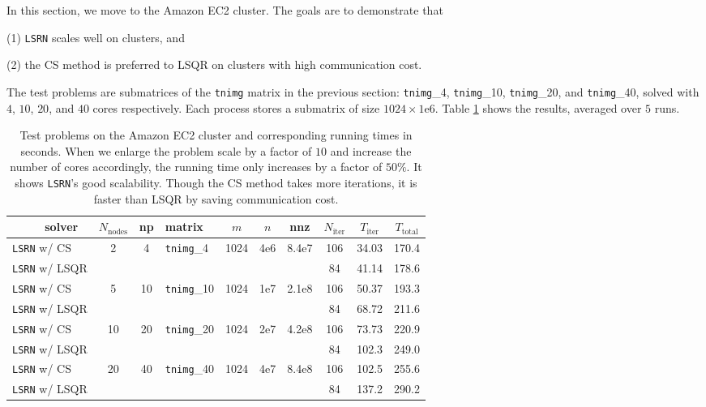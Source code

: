 \documentclass{siamltex}
\begin{document}
In this section, we move to the Amazon EC2 cluster. The goals are to
demonstrate that
\begin{inparaenum} 
\item[(1)] \texttt{LSRN} scales well on clusters, and
\item[(2)] the CS method is preferred to LSQR on clusters
  with high communication cost.
\end{inparaenum}
The test problems are submatrices of the \texttt{tnimg} matrix in the previous
section: \texttt{tnimg}\_4, \texttt{tnimg}\_10, \texttt{tnimg}\_20, and
\texttt{tnimg}\_40, solved with $4$, $10$, $20$, and $40$ cores
respectively. Each process stores a submatrix of size $1024 \times
1\mathrm{e}6$. Table \ref{tab:cluster} shows the results, averaged over $5$
runs.
\begin{table}
  \centering
  \caption{Test problems on the Amazon EC2 cluster and corresponding running
    times in seconds.  When we enlarge the problem scale by a factor of $10$ and
    increase the number of cores accordingly, the running time only increases by a
    factor of $50\%$. It shows \texttt{LSRN}'s good scalability.  Though the CS
    method takes more iterations, it is faster than LSQR by saving communication
    cost.}
\small
  \newcommand{\z}{\phantom0}
  \begin{tabular}{l|c|c|l|c|c|c|c|c|c}
    \ \ \ \ \ solver & $N_{\text{nodes}}$ & np & matrix & $m$ & $n$ & nnz &  $N_{\text{iter}}$ & $T_{\text{iter}}$ & $T_{\text{total}}$ \\
    \hline
    \texttt{LSRN} w/ CS & \multirow{2}{*}{\z2} & \multirow{2}{*}{\z4} & \multirow{2}{*}{\texttt{tnimg}\_4} & \multirow{2}{*}{1024} & \multirow{2}{*}{4e6} & \multirow{2}{*}{8.4e7} & 106 & 34.03 & 170.4 \\
    \texttt{LSRN} w/ LSQR & & & & & & & \z84 & 41.14 & 178.6 \\
    \hline
    \texttt{LSRN} w/ CS & \multirow{2}{*}{\z5} & \multirow{2}{*}{10} &  \multirow{2}{*}{\texttt{tnimg}\_10} & \multirow{2}{*}{1024} & \multirow{2}{*}{1e7} & \multirow{2}{*}{2.1e8} & 106 & 50.37 & 193.3 \\
    \texttt{LSRN} w/ LSQR & & & & & & & \z84 & 68.72 & 211.6 \\
    \hline
    \texttt{LSRN} w/ CS & \multirow{2}{*}{10} & \multirow{2}{*}{20} &  \multirow{2}{*}{\texttt{tnimg}\_20} & \multirow{2}{*}{1024} & \multirow{2}{*}{2e7} & \multirow{2}{*}{4.2e8}   & 106 & 73.73 & 220.9 \\
    \texttt{LSRN} w/ LSQR & &  & &  & & & \z84 & 102.3 & 249.0 \\
    \hline
    \texttt{LSRN} w/ CS &  \multirow{2}{*}{20} & \multirow{2}{*}{40} &  \multirow{2}{*}{\texttt{tnimg}\_40} & \multirow{2}{*}{1024} & \multirow{2}{*}{4e7} & \multirow{2}{*}{8.4e8}  & 106 & 102.5 & 255.6 \\
    \texttt{LSRN} w/ LSQR & & & &  &  & & \z84 & 137.2 & 290.2 \\
  \end{tabular}
  \label{tab:cluster}
\end{table}
\end{document}
